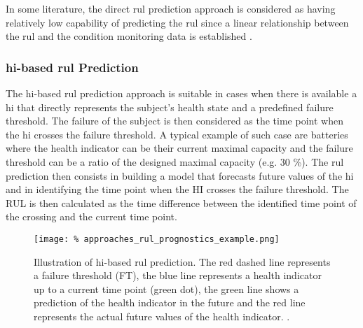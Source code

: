 In some literature, the direct \acrshort{rul} prediction approach is considered as having relatively low capability of predicting the \acrshort{rul} since a linear relationship between the \acrshort{rul} and the condition monitoring data is established \cite{jia2018review}.

\subsubsection{\acrshort{hi}-based \acrshort{rul} Prediction}
\label{sec:approaches_rul_hi_based}

The \acrshort{hi}-based \acrshort{rul} prediction approach is suitable in cases when there is available a \acrfull{hi} that directly represents the subject's health state and a predefined failure threshold.
The failure of the subject is then considered as the time point when the \acrshort{hi} crosses the failure threshold.
A typical example of such case are batteries where the health indicator can be their current maximal capacity and the failure threshold can be a ratio of the designed maximal capacity (e.g. 30 \%).
The \acrshort{rul} prediction then consists in building a model that forecasts future values of the \acrshort{hi} and in identifying the time point when the HI crosses the failure threshold.
The RUL is then calculated as the time difference between the identified time point of the crossing and the current time point.

\begin{figure}
    \centering
    \texttt{[image: \%
        approaches\_rul\_prognostics\_example.png]}
    \caption{Illustration of \acrshort{hi}-based \acrshort{rul} prediction.
             The red dashed line represents a failure threshold (FT), the blue line
             represents a health indicator up to a current time point (green dot), the green
             line shows a prediction of the health indicator in the future and
             the red line represents the actual future values of the health indicator.
             \cite{lei2018machinery}.}
    \label{fig:approaches_rul_prognostics_example}
\end{figure}

